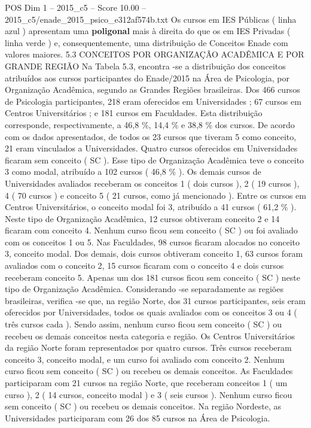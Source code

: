 \begin{textsample}{POS Dim 1 – 2015\_c5 – Score 10.00 – 2015\_c5/enade\_2015\_psico\_e312af574b.txt}
Os cursos em IES Públicas ( linha azul ) apresentam uma \textbf{poligonal} mais à direita do que os em IES Privadas ( linha verde ) e, consequentemente, uma distribuição de Conceitos Enade com valores maiores. 5.3 CONCEITOS POR ORGANIZAÇÃO ACADÊMICA E POR GRANDE REGIÃO Na Tabela 5.3, encontra -se a distribuição dos conceitos atribuídos aos cursos participantes do Enade/2015 na Área de Psicologia, por Organização Acadêmica, segundo as Grandes Regiões brasileiras.
Dos 466 cursos de Psicologia participantes, 218 eram oferecidos em Universidades ; 67 cursos em Centros Universitários ; e 181 cursos em Faculdades.
Esta distribuição corresponde, respectivamente, a 46,8 \%, 14,4 \% e 38,8 \% dos cursos.
De acordo com os dados apresentados, de todos os 23 cursos que tiveram 5 como conceito, 21 eram vinculados a Universidades.
Quatro cursos oferecidos em Universidades ficaram sem conceito ( SC ).
Esse tipo de Organização Acadêmica teve o conceito 3 como modal, atribuído a 102 cursos ( 46,8 \% ).
Os demais cursos de Universidades avaliados receberam os conceitos 1 ( dois cursos ), 2 ( 19 cursos ), 4 ( 70 cursos ) e conceito 5 ( 21 cursos, como já mencionado ).
Entre os cursos em Centros Universitários, o conceito modal foi 3, atribuído a 41 cursos ( 61,2 \% ).
Neste tipo de Organização Acadêmica, 12 cursos obtiveram conceito 2 e 14 ficaram com conceito 4.
Nenhum curso ficou sem conceito ( SC ) ou foi avaliado com os conceitos 1 ou 5.
Nas Faculdades, 98 cursos ficaram alocados no conceito 3, conceito modal.
Dos demais, dois cursos obtiveram conceito 1, 63 cursos foram avaliados com o conceito 2, 15 cursos ficaram com o conceito 4 e dois cursos receberam conceito 5.
Apenas um dos 181 cursos ficou sem conceito ( SC ) neste tipo de Organização Acadêmica.
Considerando -se separadamente as regiões brasileiras, verifica -se que, na região Norte, dos 31 cursos participantes, seis eram oferecidos por Universidades, todos os quais avaliados com os conceitos 3 ou 4 ( três cursos cada ).
Sendo assim, nenhum curso ficou sem conceito ( SC ) ou recebeu os demais conceitos nesta categoria e região.
Os Centros Universitários da região Norte foram representados por quatro cursos.
Três cursos receberam conceito 3, conceito modal, e um curso foi avaliado com conceito 2.
Nenhum curso ficou sem conceito ( SC ) ou recebeu os demais conceitos.
As Faculdades participaram com 21 cursos na região Norte, que receberam conceitos 1 ( um curso ), 2 ( 14 cursos, conceito modal ) e 3 ( seis cursos ).
Nenhum curso ficou sem conceito ( SC ) ou recebeu os demais conceitos.
Na região Nordeste, as Universidades participaram com 26 dos 85 cursos na Área de Psicologia.

\end{textsample}
